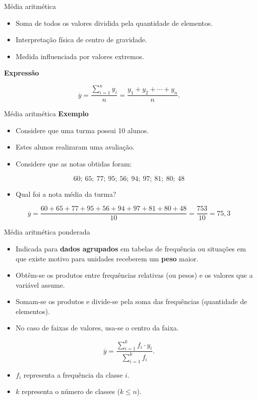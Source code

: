 \documentclass[
  ignorenonframetext,
  serif,
  professionalfont,
  usenames,
  dvipsnames,
  aspectratio = 169]{beamer}
\providecommand{\tightlist}{%
  \setlength{\itemsep}{0pt}\setlength{\parskip}{0pt}}
\renewcommand{\tightlist}{%
  \setlength{\itemsep}{0\baselineskip}
  \setlength{\parskip}{0.25\baselineskip}
}
\begin{document}
\begin{frame}{Média aritmética}
\protect\hypertarget{muxe9dia-aritmuxe9tica}{}
\begin{itemize}
\tightlist
\item
  Soma de todos os valores dividida pela quantidade de elementos.
\item
  Interpretação física de centro de gravidade.
\item
  Medida influenciada por valores extremos.
\end{itemize}

\textbf{Expressão}

\[
      \overline{y} = \dfrac{\sum_{i = 1}^{n} y_i}{n} = \frac{y_1 + y_2 + \cdots + y_n}{n}.
\]
\end{frame}

\begin{frame}{Média aritmética}
\protect\hypertarget{muxe9dia-aritmuxe9tica-1}{}
\textbf{Exemplo}

\begin{itemize}
\item
  Considere que uma turma possui 10 alunos.
\item
  Estes alunos realizaram uma avaliação.
\item
  Considere que as notas obtidas foram:
\end{itemize}

\[60;\ 65;\ 77;\ 95;\ 56;\ 94;\ 97;\ 81;\ 80;\ 48\]

\begin{itemize}
\tightlist
\item
  Qual foi a nota média da turma?
\end{itemize}

\[
\overline{y}  = \frac{60+65+77+95+56+94+97+81+80+48}{10} = \frac{753}{10} = 75,3
\]
\end{frame}

\begin{frame}{Média aritmética ponderada}
\protect\hypertarget{muxe9dia-aritmuxe9tica-ponderada}{}
\begin{itemize}
\tightlist
\item
  Indicada para \textbf{dados agrupados} em tabelas de frequência ou
  situações em que existe motivo para unidades receberem um
  \textbf{peso} maior.
\item
  Obtêm-se os produtos entre frequências relativas (ou pesos) e os
  valores que a variável assume.
\item
  Somam-se os produtos e divide-se pela soma das frequências (quantidade
  de elementos).
\item
  No caso de faixas de valores, usa-se o centro da faixa.
\end{itemize}

\[
\overline{y} = \dfrac{\sum_{i = 1}^{k} f_i \cdot y_i}{\sum_{i = 1}^{k} f_i}.
\]

\begin{itemize}
\tightlist
\item
  \(f_i\) representa a frequência da classe \(i\).
\item
  \(k\) representa o número de classes (\(k \leq n\)).
\end{itemize}
\end{frame}
\end{document}
